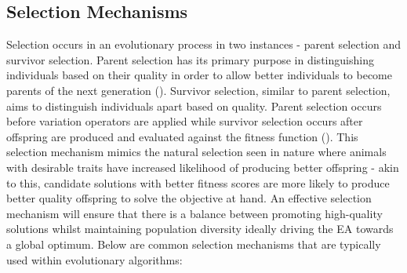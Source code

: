 \subsection{Selection Mechanisms}\label{sec:selection_mechanisms}
Selection occurs in an evolutionary process in two instances - parent selection and survivor selection. Parent selection has its primary purpose in distinguishing individuals based on their quality in order to allow better individuals to become parents of the next generation (\cite{handsOnGeneticAlgorithms}). Survivor selection, similar to parent selection, aims to distinguish individuals apart based on quality. Parent selection occurs before variation operators are applied while survivor selection occurs after offspring are produced and evaluated against the fitness function (\cite{book_introduction_to_evolutionary_computing}). This selection mechanism mimics the natural selection seen in nature where animals with desirable traits have increased likelihood of producing better offspring - akin to this, candidate solutions with better fitness scores are more likely to produce better quality offspring to solve the objective at hand. An effective selection mechanism will ensure that there is a balance between promoting high-quality solutions whilst maintaining population diversity ideally driving the EA towards a global optimum. Below are common selection mechanisms that are typically used within evolutionary algorithms:  \bigskip

